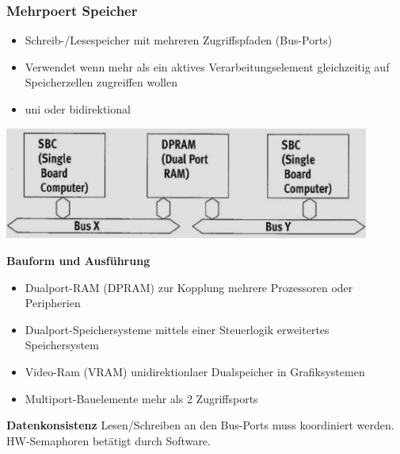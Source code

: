 \subsubsection{Mehrpoert Speicher}
\begin{itemize}
    \item Schreib-/Lesespeicher mit mehreren Zugriffspfaden (Bus-Ports)
    \item Verwendet wenn mehr als ein aktives Verarbeitungselement gleichzeitig auf Speicherzellen zugreiffen wollen
    \item uni oder bidirektional
\end{itemize}
\begin{minipage}{0.5\linewidth}
    \includegraphics[width=0.9\textwidth]{images/SystembusSpeicherSpeichersystem/SpeicherSysMehrPort}
\end{minipage}\newline
\begin{minipage}{0.6\linewidth}
    \textbf{Bauform und Ausführung}
    \begin{itemize}
        \item Dualport-RAM (DPRAM)
        \subitem zur Kopplung mehrere Prozessoren oder Peripherien
        \item Dualport-Speichersysteme
        \subitem mittels einer Steuerlogik erweitertes Speichersystem
        \item Video-Ram (VRAM)
        \subitem unidirektionlaer Dualspeicher in Grafiksystemen
        \item Multiport-Bauelemente
        \subitem mehr als 2 Zugriffsports
    \end{itemize}
\end{minipage}
\begin{minipage}{0.4\linewidth}
    \textbf{Datenkonsistenz}\newline
    Lesen/Schreiben an den Bus-Ports muss koordiniert werden. HW-Semaphoren betätigt durch Software.
\end{minipage}

